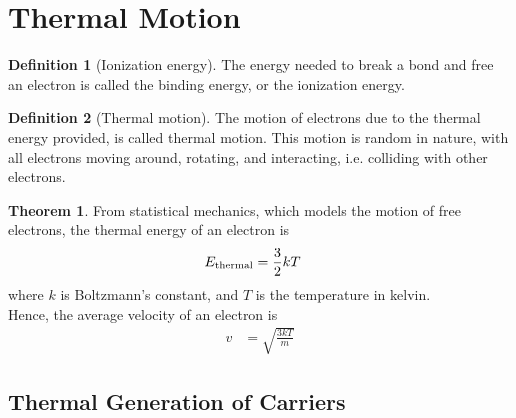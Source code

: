 \documentclass[titlepage, fleqn, a4paper, 12pt, twoside]{article}
\theoremstyle{definition}
\newtheorem{definition}{Definition}
\theoremstyle{theorem}
\newtheorem{theorem}{Theorem}
\begin{document}
\section{Thermal Motion}

\begin{definition}[Ionization energy]
	The energy needed to break a bond and free an electron is called the binding energy, or the ionization energy.
\end{definition}

\begin{definition}[Thermal motion]
	The motion of electrons due to the thermal energy provided, is called thermal motion.
	This motion is random in nature, with all electrons moving around, rotating, and interacting, i.e. colliding with other electrons.
\end{definition}

\begin{theorem}
	From statistical mechanics, which models the motion of free electrons, the thermal energy of an electron is
	\begin{align*}
		E_{\textnormal{thermal}} &= \frac{3}{2} k T
	\end{align*}
	where $k$ is Boltzmann's constant, and $T$ is the temperature in kelvin.\\
	Hence, the average velocity of an electron is
	\begin{align*}
		v &= \sqrt{\frac{3 k T}{m}}
	\end{align*}
\end{theorem}

\subsection{Thermal Generation of Carriers}
\end{document}
